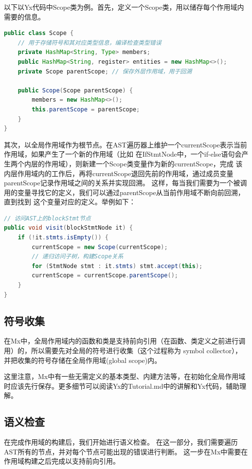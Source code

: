 以下以Yx代码中Scope类为例。首先，定义一个Scope类，用以储存每个作用域内需要的信息。
\begin{lstlisting}[language=Java]
public class Scope {
    // 用于存储符号和其对应类型信息，编译检查类型错误
    private HashMap<String, Type> members;
    public HashMap<String, register> entities = new HashMap<>();
    private Scope parentScope; // 保存外层作用域，用于回溯

    public Scope(Scope parentScope) {
        members = new HashMap<>();
        this.parentScope = parentScope;
    }
}
\end{lstlisting}

其次，以全局作用域作为根节点。在AST遍历器上维护一个currentScope表示当前作用域，如果产生了一个新的作用域（比如
在IfStmtNode中，一个if-else语句会产生两个内层的作用域），则新建一个Scope类变量作为新的currentScope，完成
该内层作用域内的工作后，再将currentScope退回先前的作用域，通过成员变量parentScope记录作用域之间的关系并实现回溯。
这样，每当我们需要为一个被调用的变量寻找它的定义，我们可以通过parentScope从当前作用域不断向前回溯，直到找到
这个变量对应的定义。举例如下：
\begin{lstlisting}[language=Java]
// 访问AST上的blockStmt节点
public void visit(blockStmtNode it) {
    if (!it.stmts.isEmpty()) {
        currentScope = new Scope(currentScope);
        // 递归访问子树，构建Scope关系
        for (StmtNode stmt : it.stmts) stmt.accept(this);
        currentScope = currentScope.parentScope();
    }
}
\end{lstlisting}

\subsection{符号收集}
在Mx中，全局作用域内的函数和类是支持前向引用（在函数、类定义之前进行调用）的，所以需要先对全局的符号进行收集（这个过程称为 symbol collector），
并把收集的符号存储在全局作用域(global scope)内。

这里注意，Mx中有一些无需定义的基本类型、内建方法等，在初始化全局作用域时应该先行保存。更多细节可以阅读Yx的Tutorial.md中的讲解和Yx代码，辅助理解。

\subsection{语义检查}
在完成作用域的构建后，我们开始进行语义检查。
在这一部分，我们需要遍历AST所有的节点，并对每个节点可能出现的错误进行判断。
这一步在Mx中需要在作用域构建之后完成以支持前向引用。

